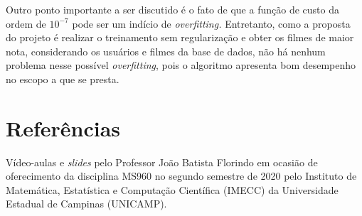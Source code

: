\documentclass[12pt]{article}
\begin{document}
Outro ponto importante a ser discutido é o fato de que a função de custo da ordem de $10^{-7}$ pode ser um indício de \textit{overfitting.} Entretanto, como a proposta do projeto é realizar o treinamento sem regularização e obter os filmes de maior nota, considerando os usuários e filmes da base de dados, não há nenhum problema nesse possível \textit{overfitting}, pois o algoritmo apresenta bom desempenho no escopo a que se presta.

\section{Referências}
Vídeo-aulas e \textit{slides} pelo Professor João Batista Florindo em ocasião de oferecimento da disciplina MS960 no segundo semestre de 2020 pelo Instituto de Matemática, Estatística e Computação Científica (IMECC) da Universidade Estadual de Campinas (UNICAMP).
\end{document}
